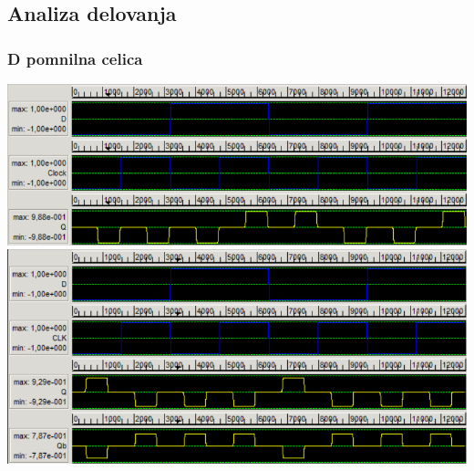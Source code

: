 \documentclass[a4paper, 11pt]{article}
\begin{document}
\subsection{Analiza delovanja}
\subsubsection{D pomnilna celica}
\includegraphics[scale=0.5]{../img/vir_4/sim_d.png} \\
\includegraphics[scale=0.5]{../img/vir_5/sim_d.png}
\end{document}
